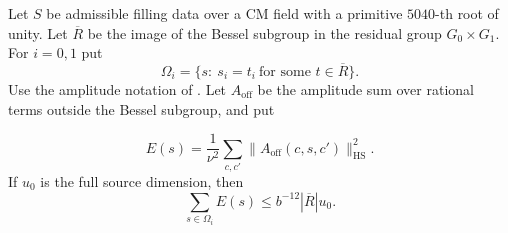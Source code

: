 \begin{lemma}
\label{lem:b-bessel-remainder}
\emitthmsource
Let $S$ be admissible filling data over a CM field with a primitive $5040$-th root of unity.
Let $\overline R$ be the image of the Bessel subgroup in the residual group $G_0\times G_1$.
For $i=0,1$ put
\[
 \Omega_i=\{s:\ s_i=t_i\ \text{for some }t\in\overline R\}.
\]
Use the amplitude notation of .
Let $A_{\mathrm{off}}$ be the amplitude sum over rational terms outside the Bessel subgroup, and put

\[
 E(s)=\frac{1}{\nu^2}\sum_{c,c'}\|A_{\mathrm{off}}(c,s,c')\|_{\mathrm{HS}}^2 .
\]
If $u_0$ is the full source dimension, then
\[
 \sum_{s\in\Omega_i}E(s)\le b^{-12}|\overline R|u_0.
\]
\end{lemma}
